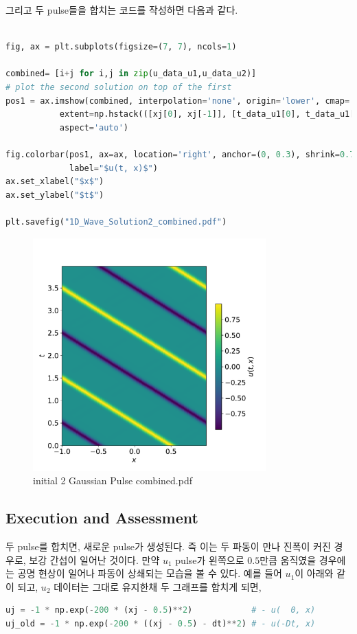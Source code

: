 \documentclass[11pt]{article}
\begin{document}
그리고 두 pulse들을 합치는 코드를 작성하면 다음과 같다.
\begin{lstlisting}[language=Python]

fig, ax = plt.subplots(figsize=(7, 7), ncols=1)

combined= [i+j for i,j in zip(u_data_u1,u_data_u2)]
# plot the second solution on top of the first
pos1 = ax.imshow(combined, interpolation='none', origin='lower', cmap='viridis',
           extent=np.hstack(([xj[0], xj[-1]], [t_data_u1[0], t_data_u1[-1]])),
           aspect='auto')

fig.colorbar(pos1, ax=ax, location='right', anchor=(0, 0.3), shrink=0.7,
             label="$u(t, x)$")
ax.set_xlabel("$x$")
ax.set_ylabel("$t$")

plt.savefig("1D_Wave_Solution2_combined.pdf")

\end{lstlisting}
\begin{figure}[!ht]
  \centering
  \includegraphics[width=0.8\textwidth]{1d_Wave_Solution2_combined.pdf}
  \caption{initial 2 Gaussian Pulse combined.pdf}
\end{figure}
\pagebreak

\subsection{Execution and Assessment}
두 pulse를 합치면, 새로운 pulse가 생성된다. 즉 이는 두 파동이 만나 진폭이 커진 경우로, 보강 간섭이 일어난 것이다. 만약 $u_1$ pulse가 왼쪽으로 $0.5$만큼 움직였을 경우에는 공명 현상이 일어나 파동이 상쇄되는 모습을 볼 수 있다. 예를 들어 $u_1$이 아래와 같이 되고, $u_2$ 데이터는 그대로 유지한채 두 그래프를 합치게 되면,
\begin{lstlisting}[language=Python]
uj = -1 * np.exp(-200 * (xj - 0.5)**2)            # - u(  0, x)
uj_old = -1 * np.exp(-200 * ((xj - 0.5) - dt)**2) # - u(-Dt, x)
\end{lstlisting}
\end{document}
